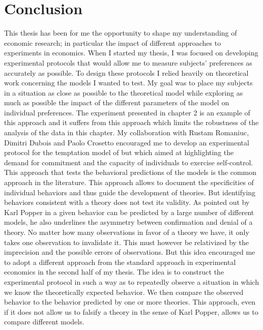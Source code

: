 \documentclass[
]{book}
\begin{document}
\hypertarget{conclusion5}{%
\chapter{Conclusion}\label{conclusion5}}

This thesis has been for me the opportunity to shape my understanding of
economic research;
in particular the impact of different approaches to experiments in economics.
When I started my thesis, I was focused on developing experimental protocols
that would allow me to measure subjects' preferences as accurately as possible.
To design these protocols I relied heavily on theoretical work concerning the
models I wanted to test.
My goal was to place my subjects in a situation as close as possible to the
theoretical model while exploring as much as possible the impact of the
different parameters of the model on individual preferences.
The experiment presented in chapter 2 is an example of this approach and it
suffers from this approach which limits the robustness of the analysis of the
data in this chapter.
My collaboration with Rustam Romaniuc, Dimitri Dubois and Paolo Crosetto
encouraged me to develop an experimental protocol for the temptation model of
\citet{gul2001temptation} but which aimed at highlighting the demand for commitment and
the capacity of individuals to exercise self-control.
This approach that tests the behavioral predictions of the models is the common
approach in the literature.
This approach allows to document the specificities of individual behaviors
and thus guide the development of theories.
But identifying behaviors consistent with a theory does not test its validity.
As pointed out by Karl Popper in \citet{popper2005logic} a given behavior can be
predicted by a large number of different models, he also underlines the
asymmetry between confirmation and denial of a theory.
No matter how many observations in favor of a theory we have, it only takes one
observation to invalidate it.
This must however be relativized by the imprecision and the possible errors of
observations.
But this idea encouraged me to adopt a different approach from the standard
approach in experimental economics in the second half of my thesis.
The idea is to construct the experimental protocol in such a way as to
repeatedly observe a situation in which we know the theoretically expected
behavior.
We then compare the observed behavior to the behavior predicted by one or more
theories.
This approach, even if it does not allow us to falsify a theory in the sense of
Karl Popper, allows us to compare different models.
\end{document}
